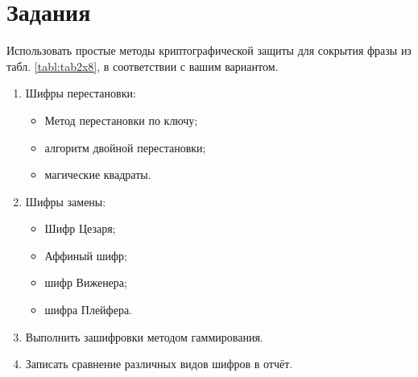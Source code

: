 \section{Задания}\label{sect8_b}
%
Использовать простые методы криптографической защиты для сокрытия фразы из
табл. \ref{tabl:tab2x8}, в соответствии с вашим вариантом.
\begin{enumerate}
        \item Шифры перестановки:
      \begin{itemize}
        \item Метод перестановки по ключу;
        \item алгоритм двойной перестановки;
        \item магические квадраты.
      \end{itemize}
      \item Шифры замены:
      \begin{itemize}
        \item Шифр Цезаря;
        \item Аффиный шифр;
        \item шифр Виженера;
        \item шифра Плейфера.
      \end{itemize}
      \item Выполнить зашифровки методом гаммирования.
      \item Записать сравнение различных видов шифров в отчёт.
\end{enumerate}

